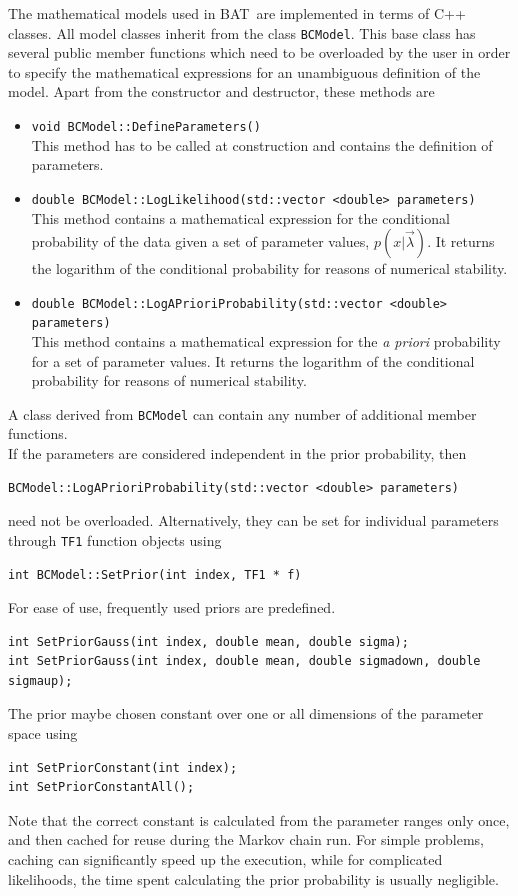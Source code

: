 \documentclass[11pt, a4paper]{article}
\newcommand{\bat}{{\sc BAT}}
\begin{document}
The mathematical models used in \bat\ are implemented in terms of C++
classes. All model classes inherit from the class \verb|BCModel|. This
base class has several public member functions which need to be
overloaded by the user in order to specify the mathematical
expressions for an unambiguous definition of the model. Apart from the
constructor and destructor, these methods are
%
\begin{itemize}
\item \verb|void BCModel::DefineParameters()| \\
This method has to be called at construction and contains the
definition of parameters.
%
\item
  \verb|double BCModel::LogLikelihood(std::vector <double> parameters)|
  \\ This method contains a mathematical expression for the
  conditional probability of the data given a set of parameter values,
  $p(x|\vec{\lambda})$. It returns the logarithm of the conditional
  probability for reasons of numerical stability.
%
\item
  \verb|double BCModel::LogAPrioriProbability(std::vector <double> parameters)|
  \\ This method contains a mathematical expression for the {\it a
    priori} probability for a set of parameter values. It returns the
  logarithm of the conditional probability for reasons of numerical
  stability.
\end{itemize}

\noindent
A class derived from \verb|BCModel| can contain any number of
additional member functions. \\

\noindent
If the parameters are considered independent in the prior probability,
then
%
\begin{verbatim}
BCModel::LogAPrioriProbability(std::vector <double> parameters)
\end{verbatim}
%
need not be overloaded.  Alternatively, they can be set for individual
parameters through \verb|TF1| function objects using
%
\begin{verbatim}
int BCModel::SetPrior(int index, TF1 * f)
\end{verbatim}
%
For ease of use, frequently used priors are predefined.
%
\begin{verbatim}
int SetPriorGauss(int index, double mean, double sigma);
int SetPriorGauss(int index, double mean, double sigmadown, double sigmaup);
\end{verbatim}
%
The prior maybe chosen constant over one or all dimensions of the
parameter space using
%
\begin{verbatim}
int SetPriorConstant(int index);
int SetPriorConstantAll();
\end{verbatim}
%
Note that the correct constant is calculated from the parameter ranges
only once, and then cached for reuse during the Markov chain run. For
simple problems, caching can significantly speed up the execution,
while for complicated likelihoods, the time spent calculating the
prior probability is usually negligible. \\
\end{document}
